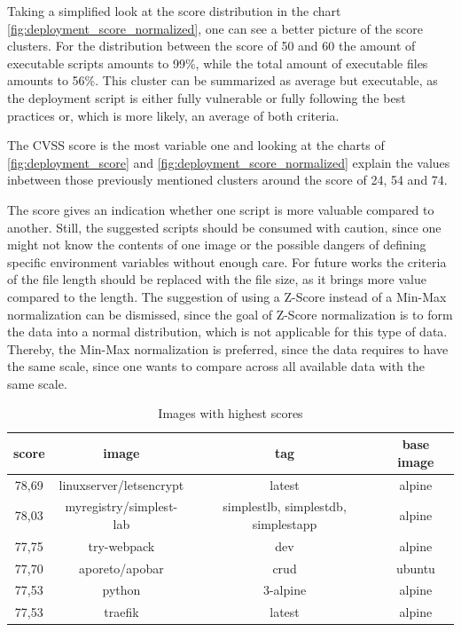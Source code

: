 Taking a simplified look at the score distribution in the chart \ref{fig:deployment_score_normalized}, one can see a better picture of the score clusters. For the distribution between the score of 50 and 60 the amount of executable scripts amounts to 99\%, while the total amount of executable files amounts to 56\%. This cluster can be summarized as average but executable, as the deployment script is either fully vulnerable or fully following the best practices or, which is more likely, an average of both criteria.

The CVSS score is the most variable one and looking at the charts of \ref{fig:deployment_score} and \ref{fig:deployment_score_normalized} explain the values inbetween those previously mentioned clusters around the score of 24, 54 and 74.

The score gives an indication whether one script is more valuable compared to another. Still, the suggested scripts should be consumed with caution, since one might not know the contents of one image or the possible dangers of defining specific environment variables without enough care.
For future works the criteria of the file length should be replaced with the file size, as it brings more value compared to the length. The suggestion of using a Z-Score instead of a Min-Max normalization can be dismissed, since the goal of Z-Score normalization is to form the data into a normal distribution, which is not applicable for this type of data. Thereby, the Min-Max normalization is preferred, since the data requires to have the same scale, since one wants to compare across all available data with the same scale.

\begin{table}[h!]
    \centering
    \begin{tabular}{ |c|c|c|c| }
    \hline
    score & image & tag & base image \\
    \hline
         78,69 & linuxserver/letsencrypt & latest & alpine \\
         78,03 & myregistry/simplest-lab & simplestlb, simplestdb, simplestapp & alpine \\
         77,75 & try-webpack & dev & alpine\\
         77,70 & aporeto/apobar & crud & ubuntu \\
         77,53 & python & 3-alpine & alpine\\
         77,53 & traefik & latest & alpine\\
    \hline
    \end{tabular}
    \caption{Images with highest scores}
    \label{images_with_highest_score}
\end{table}

